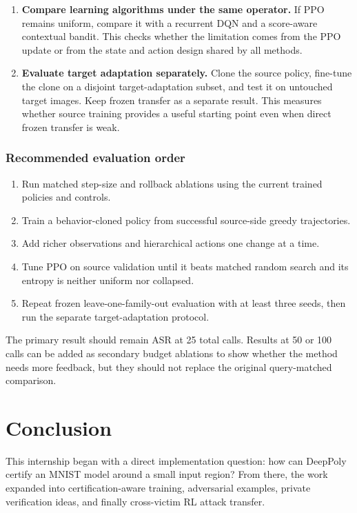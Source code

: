 \documentclass[11pt,a4paper]{report}
\begin{document}
\begin{enumerate}
  \item \textbf{Compare learning algorithms under the same operator.}
  If PPO remains uniform, compare it with a recurrent DQN and a score-aware contextual bandit. This checks whether the limitation comes from the PPO update or from the state and action design shared by all methods.

  \item \textbf{Evaluate target adaptation separately.}
  Clone the source policy, fine-tune the clone on a disjoint target-adaptation subset, and test it on untouched target images. Keep frozen transfer as a separate result. This measures whether source training provides a useful starting point even when direct frozen transfer is weak.
\end{enumerate}

\subsection{Recommended evaluation order}

\begin{enumerate}
  \item Run matched step-size and rollback ablations using the current trained policies and controls.
  \item Train a behavior-cloned policy from successful source-side greedy trajectories.
  \item Add richer observations and hierarchical actions one change at a time.
  \item Tune PPO on source validation until it beats matched random search and its entropy is neither uniform nor collapsed.
  \item Repeat frozen leave-one-family-out evaluation with at least three seeds, then run the separate target-adaptation protocol.
\end{enumerate}

The primary result should remain ASR at 25 total calls. Results at 50 or 100 calls can be added as secondary budget ablations to show whether the method needs more feedback, but they should not replace the original query-matched comparison.

\chapter{Conclusion}

This internship began with a direct implementation question: how can DeepPoly certify an MNIST model around a small input region? From there, the work expanded into certification-aware training, adversarial examples, private verification ideas, and finally cross-victim RL attack transfer.
\end{document}
